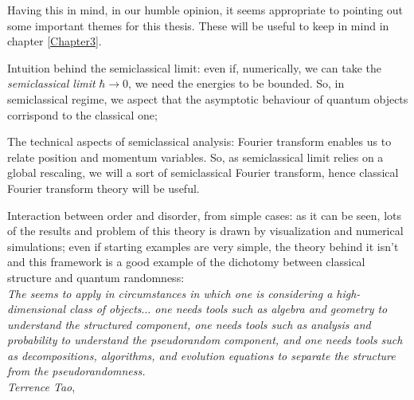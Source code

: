 Having this in mind, in our humble opinion, it seems appropriate to pointing out some important themes for this thesis. These will be useful to keep in mind in chapter \ref{Chapter3}.

\begin{compactitem}
\item Intuition behind the semiclassical limit: even if, numerically, we can take the \emph{semiclassical limit} $\hbar\to0$, we need the energies to be bounded. So, in semiclassical regime, we aspect that the asymptotic behaviour of quantum objects corrispond to the classical one; 
\item The technical aspects of semiclassical analysis: Fourier transform enables us to relate position and momentum variables. So, as semiclassical limit relies on a global rescaling, we will a sort of semiclassical Fourier transform, hence classical Fourier transform theory will be useful.
\item Interaction between order and disorder, from simple cases: as it can be seen, lots of the results and problem of this theory is drawn by visualization and numerical simulations; even if starting examples are very simple, the theory behind it isn't and this framework is a good example of the dichotomy between classical structure and quantum randomness:\\[2mm]
\textit{The  seems to apply in circumstances
in which one is considering a high-dimensional class of objects$\ldots$ one needs tools such as algebra and geometry to understand the structured component, one needs tools
such as analysis and probability to understand the pseudorandom component, and one needs tools such as decompositions, algorithms, and evolution equations to separate the structure from the pseudorandomness.}\\[2mm]
\hspace*{10cm}\textsl{Terrence Tao}, \cite{tao:site_simons_lec}
\end{compactitem}

















